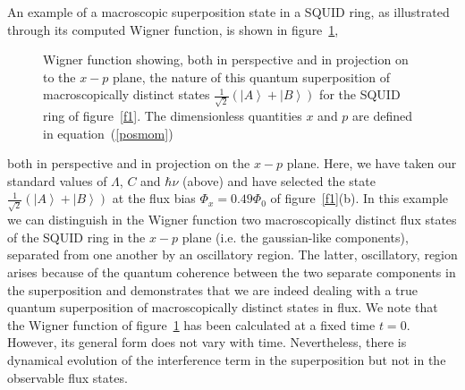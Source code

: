 \documentclass[12pt,a4paper,superscriptaddress,showpacs,floatfix,pra]{revtex4-2}
\begin{document}
An example  of a macroscopic superposition  state in a  SQUID ring, as
illustrated  through  its  computed   Wigner  function,  is  shown  in
figure~\ref{f3},
\begin{figure}[!t]
\begin{center}
\end{center}
\caption{Wigner   function  showing,  both   in  perspective   and  in
projection  on  to  the  $x-p$  plane,  the  nature  of  this  quantum
superposition       of      macroscopically       distinct      states
$\frac{1}{\sqrt{2}}\left(    \left\vert   A\right\rangle   +\left\vert
B\right\rangle \right)  $ for the  SQUID ring of  figure~\ref{f1}. The
dimensionless    quantities    $x$   and    $p$    are   defined    in
equation~(\ref{posmom}) }
\label{f3}
\end{figure}
both in  perspective and  in projection on  the $x-p$ plane.  Here, we
have taken  our standard values  of $\Lambda $,  $C$ and $\hbar  \nu $
(above)   and  have   selected  the   state  $\frac{1}{\sqrt{2}}\left(
\left\vert A\right\rangle +\left\vert  B\right\rangle \right) $ at the
flux  bias $\Phi  _{x}=0.49\Phi _{0}$  of figure~\ref{f1}(b).  In this
example we can distinguish  in the Wigner function two macroscopically
distinct flux  states of the SQUID  ring in the $x-p$  plane (i.e. the
gaussian-like   components),  separated   from  one   another   by  an
oscillatory region. The latter,  oscillatory, region arises because of
the  quantum coherence  between  the two  separate  components in  the
superposition and demonstrates that we  are indeed dealing with a true
quantum superposition  of macroscopically distinct states  in flux. We
note that  the Wigner function of figure~\ref{f3}  has been calculated
at a  fixed time $t=0$. However,  its general form does  not vary with
time.  Nevertheless, there is  dynamical evolution of the interference
term in the superposition but not in the observable flux states.
\end{document}
